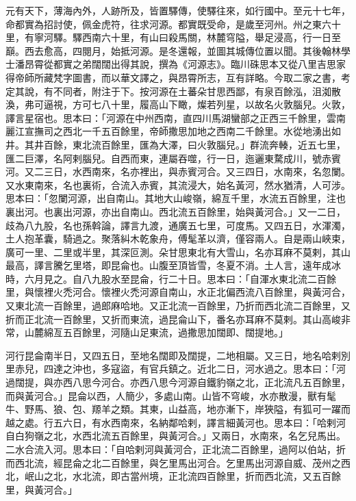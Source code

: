 \begin{pinyinscope}
 元有天下，薄海內外，人跡所及，皆置驛傳，使驛往來，如行國中。至元十七年，命都實為招討使，佩金虎符，往求河源。都實既受命，是歲至河州。州之東六十里，有寧河驛。驛西南六十里，有山曰殺馬關，林麓穹隘，舉足浸高，行一日至巔。西去愈高，四閱月，始抵河源。是冬還報，並圖其城傳位置以聞。其後翰林學士潘昂霄從都實之弟闊闊出得其說，撰為《河源志》。臨川硃思本又從八里吉思家得帝師所藏梵字圖書，而以華文譯之，與昂霄所志，互有詳略。今取二家之書，考定其說，有不同者，附注于下。按河源在土蕃朵甘思西鄙，有泉百餘泓，沮洳散渙，弗可逼視，方可七八十里，履高山下瞰，燦若列星，以故名火敦腦兒。火敦，譯言星宿也。思本曰：「河源在中州西南，直四川馬湖蠻部之正西三千餘里，雲南麗江宣撫司之西北一千五百餘里，帝師撒思加地之西南二千餘里。水從地湧出如井。其井百餘，東北流百餘里，匯為大澤，曰火敦腦兒。」群流奔輳，近五七里，匯二巨澤，名阿剌腦兒。自西而東，連屬吞噬，行一日，迤邐東騖成川，號赤賓河。又二三日，水西南來，名亦裡出，與赤賓河合。又三四日，水南來，名忽闌。又水東南來，名也裏術，合流入赤賓，其流浸大，始名黃河，然水猶清，人可涉。思本曰：「忽闌河源，出自南山。其地大山峻嶺，綿亙千里，水流五百餘里，注也裏出河。也裏出河源，亦出自南山。西北流五百餘里，始與黃河合。」又一二日，歧為八九股，名也孫斡論，譯言九渡，通廣五七里，可度馬。又四五日，水渾濁，土人抱革囊，騎過之。聚落糾木乾象舟，傅髦革以濟，僅容兩人。自是兩山峽束，廣可一里、二里或半里，其深叵測。朵甘思東北有大雪山，名亦耳麻不莫剌，其山最高，譯言騰乞里塔，即昆侖也。山腹至頂皆雪，冬夏不消。土人言，遠年成冰時，六月見之。自八九股水至昆侖，行二十日。思本曰：「自渾水東北流二百餘里，與懷裡火禿河合。懷裡火禿河源自南山，水正北偏西流八百餘里，與黃河合，又東北流一百餘里，過郎麻哈地。又正北流一百餘里，乃折而西北流二百餘里，又折而正北流一百餘里，又折而東流，過昆侖山下，番名亦耳麻不莫剌。其山高峻非常，山麓綿亙五百餘里，河隨山足東流，過撒思加闊即、闊提地。」



 河行昆侖南半日，又四五日，至地名闊即及闊提，二地相屬。又三日，地名哈剌別里赤兒，四達之沖也，多寇盜，有官兵鎮之。近北二日，河水過之。思本曰：「河過闊提，與亦西八思今河合。亦西八思今河源自鐵豹嶺之北，正北流凡五百餘里，而與黃河合。」昆侖以西，人簡少，多處山南。山皆不穹峻，水亦散漫，獸有髦牛、野馬、狼、包、羱羊之類。其東，山益高，地亦漸下，岸狹隘，有狐可一躍而越之處。行五六日，有水西南來，名納鄰哈剌，譯言細黃河也。思本曰：「哈剌河自白狗嶺之北，水西北流五百餘里，與黃河合。」又兩日，水南來，名乞兒馬出。二水合流入河。思本曰：「自哈剌河與黃河合，正北流二百餘里，過阿以伯站，折而西北流，經昆侖之北二百餘里，與乞里馬出河合。乞里馬出河源自威、茂州之西北，岷山之北，水北流，即古當州境，正北流四百餘里，折而西北流，又五百餘里，與黃河合。」




\end{pinyinscope}
